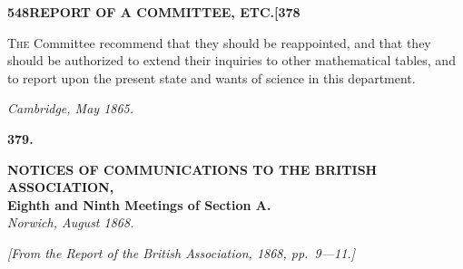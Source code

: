 \documentclass[11pt,a4paper]{article}
\begin{document}
\newpage
\noindent\textbf{548\hspace{1em}REPORT OF A COMMITTEE, ETC.\hfill[378}

\vspace{12pt}

\noindent
\textsc{The} Committee recommend that they should be reappointed, and that they should be authorized to extend their inquiries to other mathematical tables, and to report upon the present state and wants of science in this department.

\begin{flushright}
\textit{Cambridge, May 1865.}
\end{flushright}

\vspace{24pt}


\newpage
\begin{center}
\textbf{379.}
\end{center}
\vspace{-8pt}

\begin{center}
\textbf{NOTICES OF COMMUNICATIONS TO THE BRITISH ASSOCIATION,}\\[3pt]
\small\textbf{Eighth and Ninth Meetings of Section A.}\\[4pt]
\small\textit{Norwich, August 1868.}
\end{center}

\begin{flushright}
\small\textit{[From the Report of the British Association, 1868, pp.~9---11.]}
\end{flushright}

\vspace{6pt}
\end{document}
